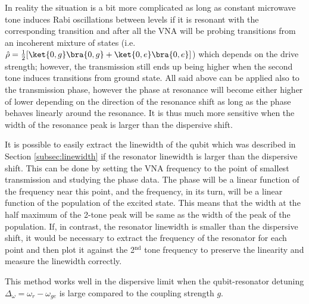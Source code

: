 In reality the situation is a bit more complicated as long as constant microwave tone induces Rabi oscillations between levels if it is resonant with the corresponding transition and after all the VNA will be probing transitions from an incoherent mixture of states (i.e. $\hat \rho = \frac{1}{2} [\ket{0, g}\bra{0,g} + \ket{0, e}\bra{0,e}]$) which depends on the drive strength; however, the transmission still ends up being higher when the second tone induces transitions from ground state. All said above can be applied also to the transmission phase, however the phase at resonance will become either higher of lower depending on the direction of the resonance shift as long as the phase behaves linearly around the resonance. It is thus much more sensitive when the width of the resonance peak is larger than the dispersive shift. 

It is possible to easily extract the linewidth of the qubit which was described in Section \ref{subsec:linewidth} if the resonator linewidth is larger than the dispersive shift. This can be done by setting the VNA frequency to the point of smallest transmission and studying the phase data. The phase will be a linear function of the frequency near this point, and the frequency, in its turn, will be a linear function of the population of the excited state. This means that the width at the half maximum of the 2-tone peak will be same as the width of the peak of the population. If, in contrast, the resonator linewidth is smaller than the dispersive shift, it would be necessary to extract the frequency of the resonator for each point and then plot it against the 2$^{\text{nd}}$ tone frequency to preserve the linearity and measure the linewidth correctly.

This method works well in the dispersive limit when the qubit-resonator detuning $\Delta_\omega = \omega_r - \omega_{ge}$ is large compared to the coupling strength $g$.
